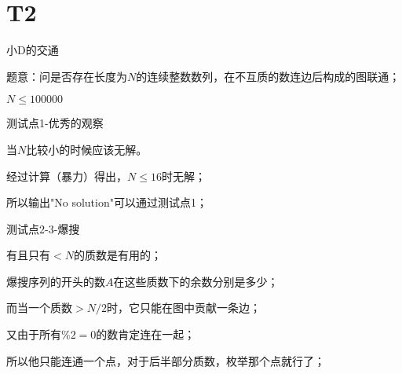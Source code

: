 \documentclass{beamer}
\begin{document}
\section{T2}

\begin{frame}{小D的交通}

	\par 题意：问是否存在长度为$N$的连续整数数列，在不互质的数连边后构成的图联通；

	\par $N \leq 100000$

\end{frame}

\begin{frame}{测试点1-优秀的观察}

	\par 当$N$比较小的时候应该无解。

	\par 经过计算（暴力）得出，$N \leq 16$时无解；

	\pause

	\par 所以输出"No solution"可以通过测试点1；

\end{frame}

\begin{frame}{测试点2-3-爆搜}

	\par 有且只有$< N$的质数是有用的；

	\pause

	\par 爆搜序列的开头的数$A$在这些质数下的余数分别是多少；		

	\pause

	\par 而当一个质数$ > N / 2$时，它只能在图中贡献一条边；

	\pause

	\par 又由于所有$\%2 = 0$的数肯定连在一起；

	\par 所以他只能连通一个点，对于后半部分质数，枚举那个点就行了；

\end{frame}
\end{document}
